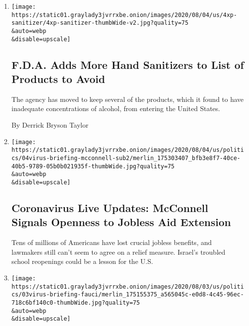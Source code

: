 \begin{enumerate}
\def\labelenumi{\arabic{enumi}.}
\item
  \href{/2020/08/04/health/fda-hand-sanitizer-recall.html}{}

  \texttt{[image: https://static01.graylady3jvrrxbe.onion/images/2020/08/04/us/4xp-sanitizer/4xp-sanitizer-thumbWide-v2.jpg?quality=75\\\&auto=webp\\\&disable=upscale]}

  \hypertarget{fda-adds-more-hand-sanitizers-to-list-of-products-to-avoid}{%
  \subsection{F.D.A. Adds More Hand Sanitizers to List of Products to
  Avoid}\label{fda-adds-more-hand-sanitizers-to-list-of-products-to-avoid}}

  The agency has moved to keep several of the products, which it found
  to have inadequate concentrations of alcohol, from entering the United
  States.

  By Derrick Bryson Taylor
\item
  \href{/2020/08/04/world/coronavirus-cases.html}{}

  \texttt{[image: https://static01.graylady3jvrrxbe.onion/images/2020/08/04/us/politics/04virus-briefing-mcconnell-sub2/merlin\_175303407\_bfb3e8f7-40ce-40b5-9789-05b0b021935f-thumbWide.jpg?quality=75\\\&auto=webp\\\&disable=upscale]}

  \hypertarget{coronavirus-live-updates-mcconnell-signals-openness-to-jobless-aid-extension-1}{%
  \subsection{Coronavirus Live Updates: McConnell Signals Openness to
  Jobless Aid
  Extension}\label{coronavirus-live-updates-mcconnell-signals-openness-to-jobless-aid-extension-1}}

  Tens of millions of Americans have lost crucial jobless benefits, and
  lawmakers still can't seem to agree on a relief measure. Israel's
  troubled school reopenings could be a lesson for the U.S.
\item
  \href{/2020/08/03/world/coronavirus-covid-19.html}{}

  \texttt{[image: https://static01.graylady3jvrrxbe.onion/images/2020/08/03/us/politics/03virus-briefing-fauci/merlin\_175155375\_a565045c-e0d8-4c45-96ec-718c6bf140c0-thumbWide.jpg?quality=75\\\&auto=webp\\\&disable=upscale]}

  \hypertarget{fauci-supports-birxs-coronavirus-assessment-after-trump-criticizes-her}{%
}
\end{enumerate}
